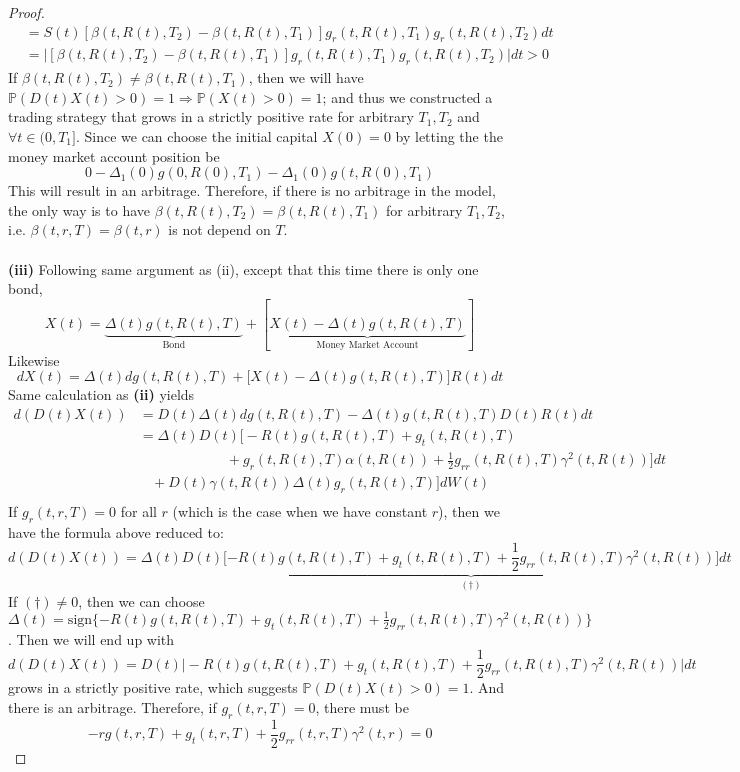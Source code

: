 \documentclass[a4paper, 10pt]{article}
\theoremstyle{definition}
\theoremstyle{hSol}
\begin{document}
\begin{proof}
\begin{equation}
\begin{split}
    &= S(t)[\beta(t,R(t),T_2)-\beta(t,R(t),T_1)]g_r(t,R(t),T_1)g_r(t,R(t),T_2)dt \\
    &= \Big|[\beta(t,R(t),T_2)-\beta(t,R(t),T_1)]g_r(t,R(t),T_1)g_r(t,R(t),T_2)\Big|dt > 0
  \end{split}
\end{equation}
If $\beta(t,R(t),T_2)\ne\beta(t,R(t),T_1)$, then we will have $\mathbb{P}\left(D(t)X(t)>0\right)=1 \Rightarrow \mathbb{P}\left(X(t)>0\right)=1$; and thus we constructed a trading strategy that grows in a strictly positive rate for arbitrary $T_1, T_2$ and $\forall t\in (0,T_1]$. Since we can choose the initial capital $X(0)=0$ by letting the the money market account position be
$$
0-\Delta_1(0)g(0,R(0), T_1)-\Delta_1(0)g(t,R(0), T_1)
$$
This will result in an arbitrage. Therefore, if there is no arbitrage in the model, the only way is to have $\beta(t,R(t),T_2)=\beta(t,R(t),T_1)$ for arbitrary $T_1, T_2$, i.e. $\beta(t,r,T)=\beta(t,r)$ is not depend on $T$.\\
~\\
\textbf{(iii)} Following same argument as (ii), except that this time there is only one bond, 
$$
X(t)=\underbrace{\Delta(t)g(t,R(t),T)}_{\text{Bond}} + [\underbrace{X(t) - \Delta(t)g(t,R(t),T)}_{\text{Money Market Account}}]
$$
Likewise
$$
dX(t) = \Delta(t)dg(t,R(t), T) + \Big[X(t)-\Delta(t)g(t,R(t), T)\Big]R(t)dt
$$ 
Same calculation as \textbf{(ii)} yields
\begin{equation}
  \begin{split}
    d(D(t)X(t)) &= D(t)\Delta(t) dg(t,R(t), T) -\Delta(t)g(t,R(t), T) D(t)R(t)dt \\
    &= \Delta(t)D(t) \Big[-R(t)g(t,R(t), T)+g_t(t,R(t),T)  \\
    &\qquad\qquad\qquad~+ g_r(t,R(t),T) \alpha(t,R(t)) + \frac{1}{2}g_{rr}(t,R(t),T)\gamma^2(t,R(t)) \Big]dt\\
    &~~~~+ D(t)\gamma(t,R(t))\Delta(t) g_r(t,R(t),T)\big] dW(t)\\
  \end{split}
\end{equation}
If $g_r(t,r,T)=0$ for all $r$ (which is the case when we have constant $r$), then we have the formula above reduced to:
\begin{equation}
  d(D(t)X(t)) = \Delta(t)D(t) \Big[\underbrace{-R(t)g(t,R(t), T)+g_t(t,R(t),T) + \frac{1}{2}g_{rr}(t,R(t),T)\gamma^2(t,R(t))}_{(\dag)} \Big]dt
\end{equation}
If $(\dag)\ne 0$, then we can choose $\Delta(t)=\text{sign}\{-R(t)g(t,R(t), T)+g_t(t,R(t),T) + \frac{1}{2}g_{rr}(t,R(t),T)\gamma^2(t,R(t))\}$. Then we will end up with
$$
d(D(t)X(t)) = D(t) \Big|-R(t)g(t,R(t), T)+g_t(t,R(t),T) + \frac{1}{2}g_{rr}(t,R(t),T)\gamma^2(t,R(t)) \Big|dt
$$
grows in a strictly positive rate, which suggests $\mathbb{P}\left(D(t)X(t)>0\right)=1$. And there is an arbitrage. Therefore, if $g_r(t,r,T)=0$, there must be 
$$
-rg(t,r, T)+g_t(t,r,T) + \frac{1}{2}g_{rr}(t,r,T)\gamma^2(t,r) = 0
$$
\end{proof}
\end{document}
